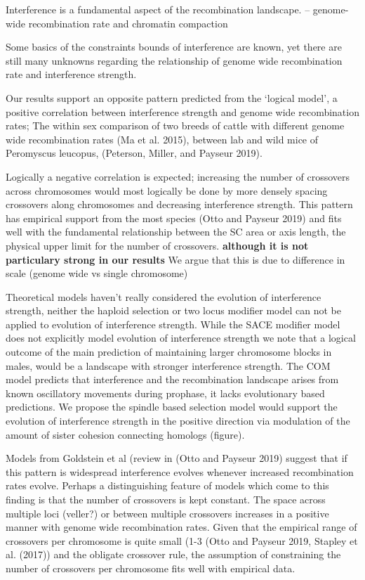 \documentclass[]{article}
\begin{document}
Interference is a fundamental aspect of the recombination landscape. --
genome-wide recombination rate and chromatin compaction

Some basics of the constraints bounds of interference are known, yet
there are still many unknowns regarding the relationship of genome wide
recombination rate and interference strength.

Our results support an opposite pattern predicted from the `logical
model', a positive correlation between interference strength and genome
wide recombination rates; The within sex comparison of two breeds of
cattle with different genome wide recombination rates (Ma et al. 2015),
between lab and wild mice of Peromyscus leucopus, (Peterson, Miller, and
Payseur 2019).

Logically a negative correlation is expected; increasing the number of
crossovers across chromosomes would most logically be done by more
densely spacing crossovers along chromosomes and decreasing interference
strength. This pattern has empirical support from the most species (Otto
and Payseur 2019) and fits well with the fundamental relationship
between the SC area or axis length, the physical upper limit for the
number of crossovers. \textbf{although it is not particulary strong in
our results} We argue that this is due to difference in scale (genome
wide vs single chromosome)

Theoretical models haven't really considered the evolution of
interference strength, neither the haploid selection or two locus
modifier model can not be applied to evolution of interference strength.
While the SACE modifier model does not explicitly model evolution of
interference strength we note that a logical outcome of the main
prediction of maintaining larger chromosome blocks in males, would be a
landscape with stronger interference strength. The COM model predicts
that interference and the recombination landscape arises from known
oscillatory movements during prophase, it lacks evolutionary based
predictions. We propose the spindle based selection model would support
the evolution of interference strength in the positive direction via
modulation of the amount of sister cohesion connecting homologs
(figure).

Models from Goldstein et al (review in (Otto and Payseur 2019) suggest
that if this pattern is widespread interference evolves whenever
increased recombination rates evolve. Perhaps a distinguishing feature
of models which come to this finding is that the number of crossovers is
kept constant. The space across multiple loci (veller?) or between
multiple crossovers increases in a positive manner with genome wide
recombination rates. Given that the empirical range of crossovers per
chromosome is quite small (1-3 (Otto and Payseur 2019, Stapley et al.
(2017)) and the obligate crossover rule, the assumption of constraining
the number of crossovers per chromosome fits well with empirical data.
\end{document}
